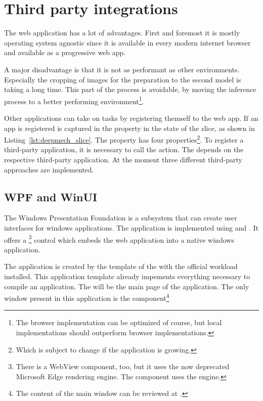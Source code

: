 \section{Third party integrations}

The web application has a lot of advantages.
First and foremost it is mostly operating system agnostic since it is available in every modern internet browser and available as a progressive web app.

A major disadvantage is that it is not as performant as other environments.
Especially the cropping of images for the preparation to the second model is taking a long time.
This part of the process is avoidable, by moving the inference process to a better performing environment\footnote{The browser implementation can be optimized of course, but local implementations should outperform browser implementations. }. %

Other applications can take on tasks by registering themself to the web app.
If an app is registered is captured in the  property in the state of the  slice, as shown in Listing~\ref{lst:deepmech_slice}.
The  property has four properties\footnote{Which is subject to change if the application is growing.}.
To register a third-party application, it is necessary to call the  action.
The  depends on the respective third-party application.
At the moment three different third-party approaches are implemented.

\subsection{WPF and WinUI}

The Windows Presentation Foundation is a subsystem that can create user interfaces for windows applications.
The application is implemented using  and .
It offers a \footnote{There is a WebView component, too, but it uses the now deprecated Microsoft Edge rendering engine. The  component uses the  engine.} control which embeds the web application into a native windows application.

The application is created by the template  of the  with the official  workload installed.
This application template already impements everything necessary to compile an application.
The  will be the main page of the application.
The only window present in this application is the  component\footnote{The content of the main window can be reviewed at .}


